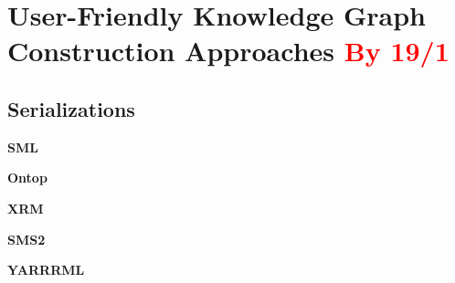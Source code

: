 \section{User-Friendly Knowledge Graph Construction Approaches \textcolor{red}{By 19/1}}
\label{sec:chp2_easy_kgc}


\subsection{Serializations}

\noindent\textbf{SML}~\parencite{Stadler2015sml}

\noindent\textbf{Ontop}~\parencite{rodriguez2015efficient}

\noindent\textbf{XRM}~\parencite{xrm}

\noindent\textbf{SMS2}~\parencite{sms2}

\noindent\textbf{YARRRML}~\parencite{Heyvaert2018yarrrml}

